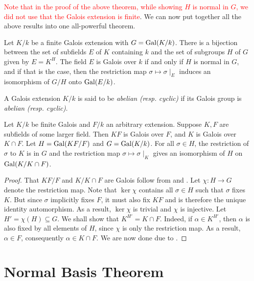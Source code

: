 \textcolor{red}{Note that in the proof of the above theorem, while showing $H$ is normal in $G$, we did not use that the Galois extension is finite}. We can now put together all the above results into one all-powerful theorem.

\begin{theorem}
    Let $K/k$ be a finite Galois extension with $G = \operatorname{Gal}(K/k)$. There is a bijection between the set of subfields $E$ of $K$ containing $k$ and the set of subgroups $H$ of $G$ given by $E = K^H$. The field $E$ is Galois over $k$ if and only if $H$ is normal in $G$, and if that is the case, then the restriction map $\sigma\mapsto\sigma\mid_E$ induces an isomorphism of $G/H$ onto $\operatorname{Gal}(E/k)$.
\end{theorem}

\begin{definition}
    A Galois extension $K/k$ is said to be \textit{abelian (resp. cyclic)} if its Galois group is \textit{abelian (resp. cyclic)}.
\end{definition}

\begin{theorem}
    Let $K/k$ be finite Galois and $F/k$ an arbitrary extension. Suppose $K, F$ are subfields of some larger field. Then $KF$ is Galois over $F$, and $K$ is Galois over $K\cap F$. Let $H = \operatorname{Gal}(KF/F)$ and $G = \operatorname{Gal}(K/k)$. For all $\sigma\in H$, the restriction of $\sigma$ to $K$ is in $G$ and the restriction map $\sigma\mapsto\sigma\mid_K$ gives an isomorphism of $H$ on $\operatorname{Gal}(K/K\cap F)$.
\end{theorem}
\begin{proof}
    That $KF/F$ and $K/K\cap F$ are Galois follow from  and . Let $\chi: H\to G$ denote the restriction map. Note that $\ker\chi$ contains all $\sigma\in H$ such that $\sigma$ fixes $K$. But since $\sigma$ implicitly fixes $F$, it must also fix $KF$ and is therefore the unique identity automorphism. As a result, $\ker\chi$ is trivial and $\chi$ is injective. Let $H' = \chi(H)\subseteq G$. We shall show that $K^{H'} = K\cap F$. Indeed, if $\alpha\in K^{H'}$, then $\alpha$ is also fixed by all elements of $H$, since $\chi$ is only the restriction map. As a result, $\alpha\in F$, consequently $\alpha\in K\cap F$. We are now done due to .
\end{proof}

\section{Normal Basis Theorem}


